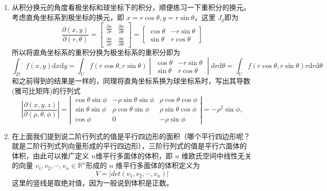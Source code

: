 \begin{enumerate}
    \item 从积分换元的角度看极坐标和球坐标下的积分，顺便练习一下重积分的换元。考虑直角坐标系到极坐标的换元，即 $x = r \cos \theta, y = r \sin \theta$，这里 $J_g$即为
    $$
    \frac{\partial (x, y)}{\partial (r, \theta)} =
    \begin{bmatrix}
    \frac{\partial x}{\partial r}  & \frac{\partial x}{\partial \theta }  \\
    \frac{\partial x}{\partial r}  & \frac{\partial x}{\partial \theta }  
    \end{bmatrix}
    = 
    \begin{bmatrix}
    \cos \theta  & -r \sin  \theta \\
    \sin \theta  & r \cos \theta
    \end{bmatrix}
    $$
    所以将直角坐标系的重积分换为极坐标系的重积分即为
    $$
    \int _D f(x,y) \mathrm{d}x \mathrm{d} y = \int _U f(r\cos \theta, r\sin \theta) \begin{vmatrix}
    \cos \theta  & -r \sin  \theta \\
    \sin \theta  & r \cos \theta
    \end{vmatrix} 
    \mathrm{d} r \mathrm{d} \theta = \int _U f(r\cos \theta, r\sin \theta) r \mathrm{d} r \mathrm{d} \theta
    $$
    和之前得到的结果是一样的，同理将直角坐标系换为球坐标系时，写出其导数(雅可比矩阵)的行列式
    $$
    \left| \frac{\partial(x,y,z)}{\partial(\rho,\theta,\phi)} \right|=\left|\begin{array}{ccc}\cos\theta\sin\phi&-\rho\sin\theta\sin\phi&\rho\cos\theta\cos\phi\\\sin\theta\sin\phi&\rho\cos\theta\sin\phi&\rho\sin\theta\cos\phi\\\cos\phi&0&-\rho\sin\phi\end{array}\right|=-\rho^2\sin\phi,
    $$

    \item 在上面我们提到说二阶行列式的值是平行四边形的面积（哪个平行四边形呢？就是二阶行列式列向量形成的平行四边形），三阶行列式的值是平行六面体的体积，由此可以推广定义 $n$维平行多面体的体积，即 $n$ 维欧氏空间中线性无关的向量 $v_1, v_2, \cdots, v_n \in \mathbb{R}^n$形成的 $n$ 维平行多面体的体积定义为
    $$
    V = |det(v_1, v_2, \cdots, v_n)|
    $$
    这里的竖线是取绝对值，因为一般说到体积是正数。
\end{enumerate}

